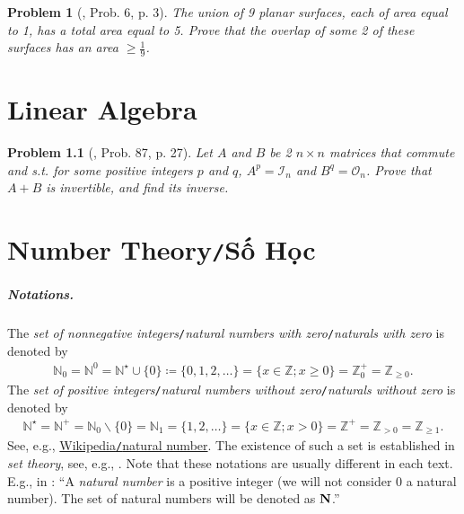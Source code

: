 \documentclass[oneside]{book}
\numberwithin{equation}{section}
\newtheorem{problem}{Problem}[section]
\begin{document}
\begin{problem}	[\cite{Gelca_Andreescu2017}, Prob. 6, p. 3]
	The union of 9 planar surfaces, each of area equal to 1, has a total area equal to 5. Prove that the overlap of some 2 of these surfaces has an area $\ge\frac{1}{9}$.
\end{problem}


\chapter{Linear Algebra}

\begin{problem}[\cite{Gelca_Andreescu2017}, Prob. 87, p. 27]
	Let $A$ and $B$ be 2 $n\times n$ matrices that commute and s.t. for some positive integers $p$ and $q$, $A^p = \mathcal{I}_n$ and $B^q = \mathcal{O}_n$. Prove that $A + B$ is invertible, and find its inverse.
\end{problem}


\chapter{Number Theory\texttt{/}Số Học}

\paragraph{Notations.} The \textit{set of nonnegative integers}\texttt{/}\textit{natural numbers with zero}\texttt{/}\textit{naturals with zero} is denoted by
\begin{align*}
	\mathbb{N}_0 = \mathbb{N}^0 = \mathbb{N}^\star\cup\{0\}\coloneqq\{0,1,2,\ldots\} = \{x\in\mathbb{Z};x\ge 0\} = \mathbb{Z}_0^+ = \mathbb{Z}_{\ge 0}.
\end{align*}
The \textit{set of positive integers}\texttt{/}\textit{natural numbers without zero}\texttt{/}\textit{naturals without zero} is denoted by
\begin{align*}
	\mathbb{N}^\star = \mathbb{N}^+ = \mathbb{N}_0\backslash\{0\} = \mathbb{N}_1 = \{1,2,\ldots\} = \{x\in\mathbb{Z};x > 0\} = \mathbb{Z}^+ = \mathbb{Z}_{> 0} = \mathbb{Z}_{\ge 1}.
\end{align*}
See, e.g., \href{https://en.wikipedia.org/wiki/Natural_number}{Wikipedia\texttt{/}natural number}. The existence of such a set is established in \textit{set theory}, see, e.g., \cite{Halmos1960, Halmos1974, Kaplansky1972, Kaplansky1977}. Note that these notations are usually different in each text. E.g., in \cite[Chap. 2, p. 10]{Tao2006}: ``A \textit{natural number} is a positive integer (we will not consider 0 a natural number). The set of natural numbers will be denoted as ${\bf N}$.''
\end{document}
